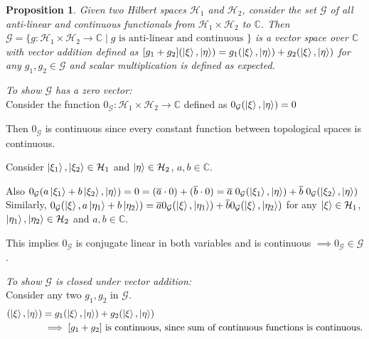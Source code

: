 \documentclass[12pt,twoside,fleqn]{report}
\makeatletter
\theoremstyle{thmstyle}
\renewenvironment{proof}[1][\proofname]{\par
\pushQED{\qed}%
\normalfont \topsep6\p@\@plus6\p@\relax
\trivlist
\item[\hskip\labelsep\itshape#1\@addpunct{.}]\mbox{}\par\nobreak\ignorespaces
}{%
    \popQED\endtrivlist\@endpefalse
    }
\newtheorem{prop}{Proposition}[chapter]
\makeatother
\begin{document}
\begin{prop}
    Given two Hilbert spaces $\mathcal{H}_1$ and $\mathcal{H}_2$, consider the set $\mathcal{G}$ of all anti-linear and continuous functionals from $\mathcal{H}_1 \times \mathcal{H}_2$ to $\mathbb{C}$.
    Then $\mathcal{G} = \{ g: \mathcal{H}_1 \times \mathcal{H}_2 \to \mathbb{C} \; | \; g \text{ is anti-linear and continuous } \}$ is a vector space over $\mathbb{C}$ with vector addition defined as $[ g_1 + g_2] (\ket{\xi}, \ket{\eta}) = g_1(\ket{\xi}, \ket{\eta}) + g_2(\ket{\xi}, \ket{\eta})$ for any $g_1, g_2 \in \mathcal{G}$ and scalar multiplication is defined as expected.
\end{prop}
\begin{proof}
    \emph{To show $\mathcal{G}$ has a zero vector:} \\

    Consider the function $0_\mathcal{G}: \mathcal{H}_1 \times \mathcal{H}_2 \to \mathbb{C}$ defined as $0_\mathcal{G}(\ket{\xi}, \ket{\eta}) = 0$

    Then $0_\mathcal{G}$ is continuous since every constant function between topological spaces is continuous.

    Consider $\ket{\xi_1}, \ket{\xi_2} \in \mathcal{H}_1$ and $\ket{\eta} \in \mathcal{H}_2$, $a,b \in \mathbb{C}$.

    Also $0_\mathcal{G}(a \ket{\xi_1} + b \ket{\xi_2}, \ket{\eta}) = 0 = (\overline{a} \cdot 0 ) + (\overline{b} \cdot 0) = \overline{a} \; 0_\mathcal{G}(\ket{\xi_1}, \ket{\eta}) + \overline{b} \; 0_\mathcal{G} (\ket{\xi_2}, \ket{\eta}) $ 
    Similarly, $0_\mathcal{G}(\ket{\xi}, a \ket{\eta_1} + b \ket{\eta_2}) = \overline{a} 0_\mathcal{G}(\ket{\xi}, \ket{\eta_1}) + \overline{b} 0_\mathcal{G}(\ket{\xi}, \ket{\eta_2})$ for any $\ket{\xi} \in \mathcal{H}_1$, $\ket{\eta_1}, \ket{\eta_2} \in \mathcal{H}_2$ and $a,b \in \mathbb{C}$.

    This implies $0_\mathcal{G}$ is conjugate linear in both variables and is continuous $\implies 0_\mathcal{G} \in \mathcal{G}$ .

    \emph{To show $\mathcal{G}$ is closed under vector addition:}\\

    Consider any two $g_1, g_2$ in $\mathcal{G}$.
    \begin{align*}
        [g_1 + g_2](\ket\xi, \ket\eta) & = g_1(\ket\xi, \ket\eta) + g_2(\ket\xi, \ket\eta)
        \\ & \implies [g_1 + g_2] \text{ is continuous, since sum of continuous functions is continuous.}
    \end{align*}


\end{proof}
\end{document}
